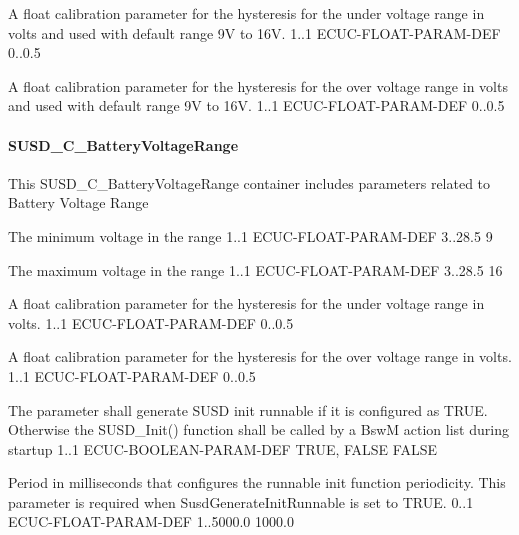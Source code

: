 {
{A float calibration parameter for the hysteresis for the under voltage range in volts and used with default range 9V to 16V.}
{1..1}
{ECUC-FLOAT-PARAM-DEF}
{0..0.5}
{}}
{ }

{
{A float calibration parameter for the hysteresis for the over voltage range in volts and used with default range 9V to 16V.}
{1..1}
{ECUC-FLOAT-PARAM-DEF}
{0..0.5}
{}}
{ }

\paragraph{SUSD_C_BatteryVoltageRange}
This SUSD_C_BatteryVoltageRange container includes parameters related to Battery Voltage Range

{
{The minimum voltage in the range}
{1..1}
{ECUC-FLOAT-PARAM-DEF}
{3..28.5}
{9}}
{}

{
{The maximum voltage in the range}
{1..1}
{ECUC-FLOAT-PARAM-DEF}
{3..28.5}
{16}}
{}

{
{A float calibration parameter for the hysteresis for the under voltage range in volts.}
{1..1}
{ECUC-FLOAT-PARAM-DEF}
{0..0.5}
{}}
{ }

{
{A float calibration parameter for the hysteresis for the over voltage range in volts.}
{1..1}
{ECUC-FLOAT-PARAM-DEF}
{0..0.5}
{}}
{ }

{
{The parameter shall generate SUSD init runnable if it is configured as TRUE. Otherwise the SUSD_Init() function shall be called by a BswM action list during startup}
{1..1}
{ECUC-BOOLEAN-PARAM-DEF}
{TRUE, FALSE}
{FALSE}}
{}

{
{Period in milliseconds that configures the runnable init function periodicity. This parameter is required when SusdGenerateInitRunnable is set to TRUE.}
{0..1}
{ECUC-FLOAT-PARAM-DEF}
{1..5000.0}
{1000.0}}
{}


